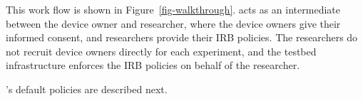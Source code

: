 This work flow is shown in Figure~\ref{fig-walkthrough}.  \sysname
acts as an intermediate between the device owner and researcher, 
where the device owners give their informed consent, and researchers
provide their IRB policies. The researchers do not recruit
device owners directly for each experiment, and the testbed infrastructure 
enforces the IRB policies on behalf of the researcher. 

\sysname's default policies are described next.

